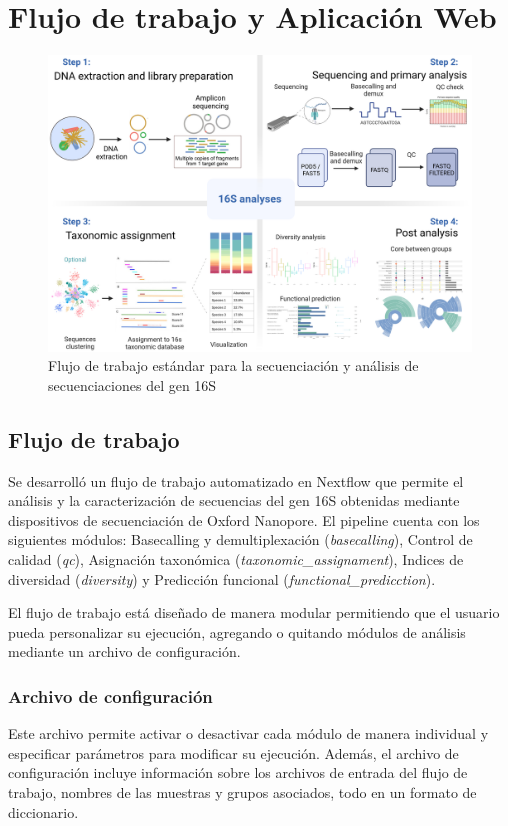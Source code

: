 \chapter{Flujo de trabajo y Aplicación Web}

\begin{figure}[H]
    \centering
    \includegraphics[width=1\linewidth]{images/16s_workflow_schema.jpeg}
    \caption{Flujo de trabajo estándar para la secuenciación y análisis de secuenciaciones del gen 16S}
    \label{fig:16S_workflow}
\end{figure}
\section{Flujo de trabajo}
Se desarrolló un flujo de trabajo automatizado en Nextflow que permite el análisis y la caracterización de secuencias del gen 16S obtenidas mediante dispositivos de secuenciación de Oxford Nanopore. 
El pipeline cuenta con los siguientes módulos: Basecalling y demultiplexación (\textit{basecalling}), Control de calidad (\textit{qc}), Asignación taxonómica (\textit{taxonomic\_assignament}), Indices de diversidad (\textit{diversity}) y Predicción funcional (\textit{functional\_predicction}).

El flujo de trabajo está diseñado de manera modular permitiendo que el usuario pueda personalizar su ejecución, agregando o quitando módulos de análisis mediante un archivo de configuración. 

\subsection{Archivo de configuración}
Este archivo permite activar o desactivar cada módulo de manera individual y especificar parámetros para modificar su ejecución. 
Además, el archivo de configuración incluye información sobre los archivos de entrada del flujo de trabajo, nombres de las muestras y grupos asociados, todo en un formato de diccionario.

